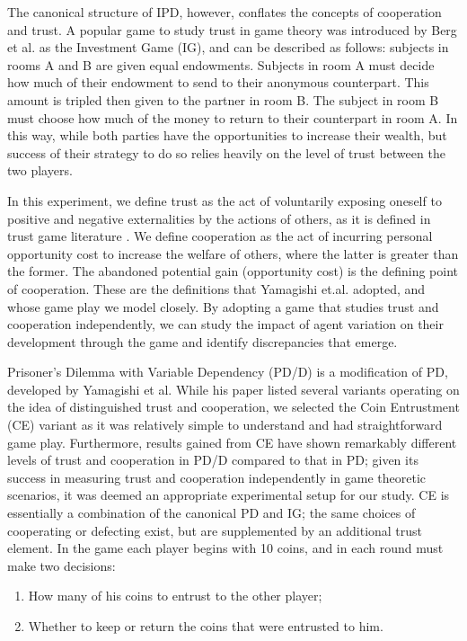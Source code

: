 \documentclass{sig-alternate}
\begin{document}
The canonical structure of IPD, however, conflates the concepts of cooperation and trust. A popular game to study trust in game theory was introduced by Berg et al.\cite{berg1995trust} as the Investment Game (IG), and can be described as follows: subjects in rooms A and B are given equal endowments. Subjects in room A must decide how much of their endowment to send to their anonymous counterpart. This amount is tripled then given to the partner in room B. The subject in room B must choose how much of the money to return to their counterpart in room A. In this way, while both parties have the opportunities to increase their wealth, but success of their strategy to do so relies heavily on the level of trust between the two players.

In this experiment, we define trust as the act of voluntarily exposing oneself to positive and negative externalities by the actions of others, as it is defined in trust game literature \cite{dasgupta2000trust}. We define cooperation as the act of incurring personal opportunity cost to increase the welfare of others, where the latter is greater than the former. The abandoned potential gain (opportunity cost) is the defining point of cooperation. These are the definitions that Yamagishi et.al. adopted, and whose game play we model closely. By adopting a game that studies trust and cooperation independently, we can study the impact of agent variation on their development through the game and identify discrepancies that emerge.

Prisoner's Dilemma with Variable Dependency (PD/D) is a modification of PD, developed by Yamagishi et al. While his paper listed several variants operating on the idea of distinguished trust and cooperation, we selected the Coin Entrustment (CE) variant as it was relatively simple to understand and had straightforward game play. Furthermore, results gained from CE have shown remarkably different levels of trust and cooperation in PD/D compared to that in PD; given its success in measuring trust and cooperation independently in game theoretic scenarios, it was deemed an appropriate experimental setup for our study. CE is essentially a combination of the canonical PD and IG; the same choices of cooperating or defecting exist, but are supplemented by an additional trust element. In the game each player begins with 10 coins, and in each round must make two decisions:

\begin{enumerate}
\item How many of his coins to entrust to the other player;
\item Whether to keep or return the coins that were entrusted to him.
\end{enumerate}
\end{document}
